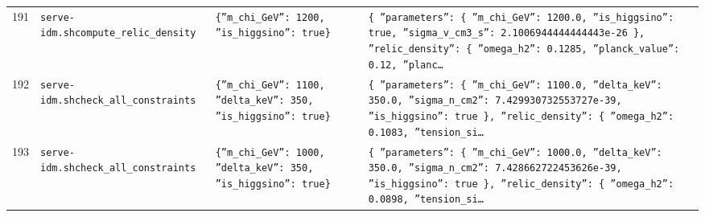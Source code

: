 \documentclass[11pt,a4paper]{article}
\begin{document}
\begin{longtable}{@{}p{}p{}p{}p{}@{}}
191 & \texttt{serve-idm.sh}\newline\texttt{compute\_\allowbreak{}relic\_\allowbreak{}density} & \texttt{\{''m\_\allowbreak{}chi\_\allowbreak{}GeV'':\allowbreak{} 1200,\allowbreak{} ''is\_\allowbreak{}higgsino'':\allowbreak{} true\}\allowbreak{}} & \texttt{\{   ''parameters'':\allowbreak{} \{     ''m\_\allowbreak{}chi\_\allowbreak{}GeV'':\allowbreak{} 1200.0,\allowbreak{}     ''is\_\allowbreak{}higgsino'':\allowbreak{} true,\allowbreak{}     ''sigma\_\allowbreak{}v\_\allowbreak{}cm3\_\allowbreak{}s'':\allowbreak{} 2.1006944444444443e-26   \}\allowbreak{},\allowbreak{}   ''relic\_\allowbreak{}density'':\allowbreak{} \{     ''omega\_\allowbreak{}h2'':\allowbreak{} 0.1285,\allowbreak{}     ''planck\_\allowbreak{}value'':\allowbreak{} 0.12,\allowbreak{}     ''planc\ldots{}\allowbreak{}} \\
192 & \texttt{serve-idm.sh}\newline\texttt{check\_\allowbreak{}all\_\allowbreak{}constraints} & \texttt{\{''m\_\allowbreak{}chi\_\allowbreak{}GeV'':\allowbreak{} 1100,\allowbreak{} ''delta\_\allowbreak{}keV'':\allowbreak{} 350,\allowbreak{} ''is\_\allowbreak{}higgsino'':\allowbreak{} true\}\allowbreak{}} & \texttt{\{   ''parameters'':\allowbreak{} \{     ''m\_\allowbreak{}chi\_\allowbreak{}GeV'':\allowbreak{} 1100.0,\allowbreak{}     ''delta\_\allowbreak{}keV'':\allowbreak{} 350.0,\allowbreak{}     ''sigma\_\allowbreak{}n\_\allowbreak{}cm2'':\allowbreak{} 7.429930732553727e-39,\allowbreak{}     ''is\_\allowbreak{}higgsino'':\allowbreak{} true   \}\allowbreak{},\allowbreak{}   ''relic\_\allowbreak{}density'':\allowbreak{} \{     ''omega\_\allowbreak{}h2'':\allowbreak{} 0.1083,\allowbreak{}     ''tension\_\allowbreak{}si\ldots{}\allowbreak{}} \\
193 & \texttt{serve-idm.sh}\newline\texttt{check\_\allowbreak{}all\_\allowbreak{}constraints} & \texttt{\{''m\_\allowbreak{}chi\_\allowbreak{}GeV'':\allowbreak{} 1000,\allowbreak{} ''delta\_\allowbreak{}keV'':\allowbreak{} 350,\allowbreak{} ''is\_\allowbreak{}higgsino'':\allowbreak{} true\}\allowbreak{}} & \texttt{\{   ''parameters'':\allowbreak{} \{     ''m\_\allowbreak{}chi\_\allowbreak{}GeV'':\allowbreak{} 1000.0,\allowbreak{}     ''delta\_\allowbreak{}keV'':\allowbreak{} 350.0,\allowbreak{}     ''sigma\_\allowbreak{}n\_\allowbreak{}cm2'':\allowbreak{} 7.428662722453626e-39,\allowbreak{}     ''is\_\allowbreak{}higgsino'':\allowbreak{} true   \}\allowbreak{},\allowbreak{}   ''relic\_\allowbreak{}density'':\allowbreak{} \{     ''omega\_\allowbreak{}h2'':\allowbreak{} 0.0898,\allowbreak{}     ''tension\_\allowbreak{}si\ldots{}\allowbreak{}} \\

\end{longtable}
\end{document}
